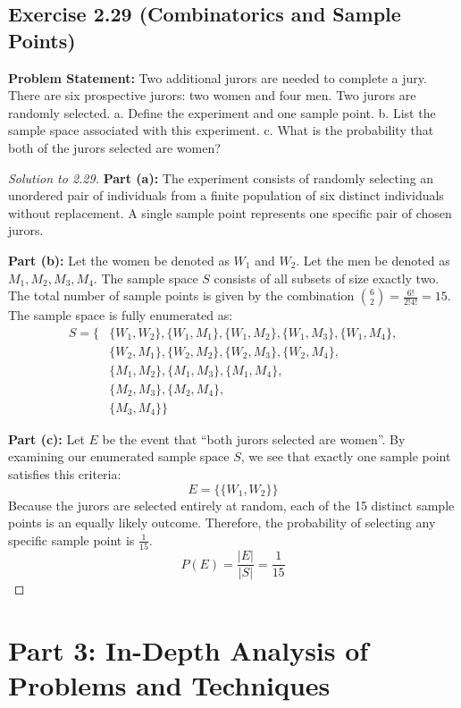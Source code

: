 \documentclass[12pt]{article}
\begin{document}
\subsection*{Exercise 2.29 (Combinatorics and Sample Points)}
\textbf{Problem Statement:} Two additional jurors are needed to complete a jury. There are six prospective jurors: two women and four men. Two jurors are randomly selected. 
a. Define the experiment and one sample point.
b. List the sample space associated with this experiment.
c. What is the probability that both of the jurors selected are women?

\begin{proof}[Solution to 2.29]
\textbf{Part (a):} The experiment consists of randomly selecting an unordered pair of individuals from a finite population of six distinct individuals without replacement. A single sample point represents one specific pair of chosen jurors.

\textbf{Part (b):} Let the women be denoted as $W_1$ and $W_2$. Let the men be denoted as $M_1, M_2, M_3, M_4$. The sample space $S$ consists of all subsets of size exactly two. The total number of sample points is given by the combination $\binom{6}{2} = \frac{6!}{2!4!} = 15$.
The sample space is fully enumerated as:
\begin{align*}
S = \big\{ &\{W_1, W_2\}, \{W_1, M_1\}, \{W_1, M_2\}, \{W_1, M_3\}, \{W_1, M_4\}, \\
           &\{W_2, M_1\}, \{W_2, M_2\}, \{W_2, M_3\}, \{W_2, M_4\}, \\
           &\{M_1, M_2\}, \{M_1, M_3\}, \{M_1, M_4\}, \\
           &\{M_2, M_3\}, \{M_2, M_4\}, \\
           &\{M_3, M_4\} \big\}
\end{align*}

\textbf{Part (c):} Let $E$ be the event that ``both jurors selected are women''. By examining our enumerated sample space $S$, we see that exactly one sample point satisfies this criteria:
\[ E = \{ \{W_1, W_2\} \} \]
Because the jurors are selected entirely at random, each of the 15 distinct sample points is an equally likely outcome. Therefore, the probability of selecting any specific sample point is $\frac{1}{15}$.
\[ P(E) = \frac{|E|}{|S|} = \frac{1}{15} \]
\end{proof}

\newpage
\section{Part 3: In-Depth Analysis of Problems and Techniques}
\end{document}
